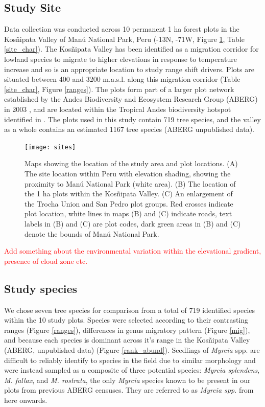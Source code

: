\documentclass[a4paper, 11pt]{article}
\newcommand{\todo}[1]{\textcolor{red}{#1}}   %
\begin{document}
\subsection{Study Site}
Data collection was conducted across 10 permanent 1 ha forest plots in the Kos\~{n}ipata Valley of Man\'{u} National Park, Peru (-13\textdegree N, -71\textdegree W, Figure \ref{sites}, Table \ref{site_char}). The Kos\~{n}ipata Valley has been identified as a migration corridor for lowland species to migrate to higher elevations in response to temperature increase \citep{Feeley2011} and so is an appropriate location to study range shift drivers. Plots are situated between 400 and 3200 m.a.s.l. along this migration corridor (Table \ref{site_char}, Figure \ref{ranges}). The plots form part of a larger plot network established by the Andes Biodiversity and Ecosystem Research Group (ABERG) in 2003 \citep{Malhi2010, Girardin2014}, and are located within the Tropical Andes biodiversity hotspot identified in \citet{Myers2000}. The plots used in this study contain 719 tree species, and the valley as a whole contains an estimated 1167 tree species (ABERG unpublished data).

\begin{figure}[H]
\texttt{[image: sites]}
\centering
\caption{Maps showing the location of the study area and plot locations. (A) The site location within Peru with elevation shading, showing the proximity to Man\'{u} National Park (white area). (B) The location of the 1 ha plots within the Kos\~{n}ipata Valley. (C) An enlargement of the Trocha Union and San Pedro plot groups. Red crosses indicate plot location, white lines in maps (B) and (C) indicate roads, text labels in (B) and (C) are plot codes, dark green areas in (B) and (C) denote the bounds of Man\'{u} National Park.}
\label{sites}
\end{figure}



\todo{Add something about the environmental variation within the elevational gradient, presence of cloud zone etc.}

\subsection{Study species} 
We chose seven tree species for comparison from a total of 719 identified species within the 10 study plots. Species were selected according to their contrasting ranges (Figure \ref{ranges}), differences in genus migratory pattern \citep{Feeley2011} (Figure \ref{mig}), and because each species is dominant across it's range in the Kos\~{n}ipata Valley (ABERG, unpublished data) (Figure \ref{rank_abund}). Seedlings of \textit{Myrcia} spp. are difficult to reliably identify to species in the field due to similar morphology and were instead sampled as a composite of three potential species: \textit{Myrcia splendens}, \textit{M. fallax}, and \textit{M. rostrata}, the only \textit{Myrcia} species known to be present in our plots from previous ABERG censuses. They are referred to as \textit{Myrcia spp.} from here onwards. 
\end{document}
